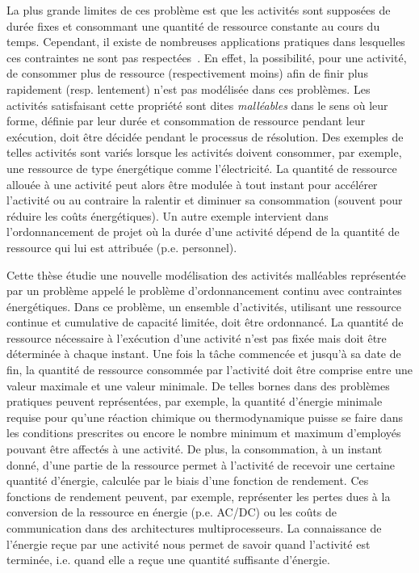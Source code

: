 La plus grande limites de ces problème est que les activités sont
supposées de durée fixes et consommant une quantité de ressource
constante au cours du temps. Cependant, il existe de nombreuses
applications pratiques dans lesquelles ces contraintes ne sont pas
respectées~\cite{HaitArtiguesLopez,Blaz,W80}. En effet, la
possibilité, pour une activité, de consommer plus de ressource
(respectivement moins) afin de finir plus rapidement (resp. lentement)
n'est pas modélisée dans ces problèmes. Les activités satisfaisant
cette propriété sont dites {\it malléables} dans le sens où leur
forme, définie par leur durée et consommation de ressource pendant
leur exécution, doit être décidée pendant le processus de
résolution. Des exemples de telles activités sont variés lorsque les
activités doivent consommer, par exemple, une ressource de type
énergétique comme 
l'électricité.  La quantité de ressource 
allouée à une activité peut alors être modulée à tout instant pour
accélérer l'activité 
ou au contraire la ralentir et diminuer sa consommation (souvent
pour réduire les coûts 
énergétiques). Un autre exemple intervient dans l'ordonnancement de
projet où la durée d'une activité dépend de la quantité de ressource
qui lui est attribuée (p.e. personnel). 

Cette thèse étudie une nouvelle modélisation des activités malléables
représentée par un problème appelé le problème d'ordonnancement
continu avec contraintes énergétiques. Dans ce problème, un ensemble
d'activités,  utilisant une ressource continue et cumulative de
capacité limitée, doit être ordonnancé. La quantité de ressource
nécessaire à l'exécution d'une activité n'est pas fixée mais doit
être déterminée à chaque instant. Une fois la tâche commencée et
jusqu'à sa date de fin, la quantité de ressource consommée par
l'activité doit être comprise entre une valeur maximale et une valeur
minimale. De telles bornes dans des problèmes pratiques
peuvent représentées, par exemple, la quantité d'énergie
minimale requise pour qu'une réaction chimique ou thermodynamique
puisse se faire dans les conditions prescrites ou encore le nombre
minimum et 
maximum d'employés pouvant être affectés à une activité.
De plus, la consommation, à un instant donné, d'une partie
de la ressource permet à l'activité de recevoir une certaine quantité
d'énergie, calculée par le biais d'une fonction de rendement. Ces
fonctions de rendement peuvent, par exemple, représenter les pertes
dues à la conversion de la ressource en énergie (p.e. AC/DC) ou les
coûts de communication dans des architectures multiprocesseurs. 
La connaissance de l'énergie reçue par une activité nous permet de
savoir quand 
l'activité est terminée, i.e. quand elle a reçue une quantité
suffisante d'énergie. 

